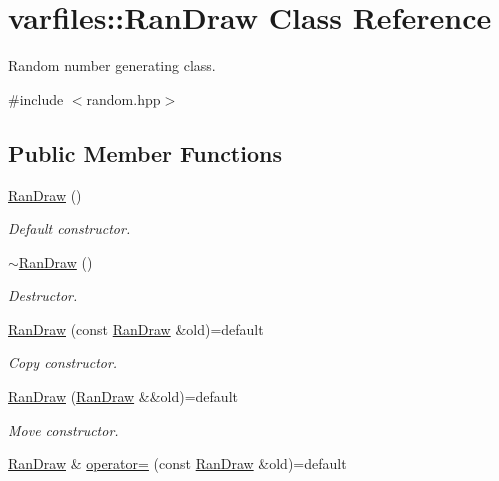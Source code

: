 \hypertarget{classvarfiles_1_1_ran_draw}{}\section{varfiles\+:\+:Ran\+Draw Class Reference}
\label{classvarfiles_1_1_ran_draw}


Random number generating class.  




{\ttfamily \#include $<$random.\+hpp$>$}

\subsection*{Public Member Functions}
\begin{DoxyCompactItemize}
\item 
\hyperlink{classvarfiles_1_1_ran_draw_aeda47451836b452b8fc819016242e6e6}{Ran\+Draw} ()
\begin{DoxyCompactList}\small\item\em Default constructor. \end{DoxyCompactList}\item 
\mbox{\label{classvarfiles_1_1_ran_draw_a0041f7be024890f48f5db63fa37a5cc3}} 
\hyperlink{classvarfiles_1_1_ran_draw_a0041f7be024890f48f5db63fa37a5cc3}{$\sim$\+Ran\+Draw} ()
\begin{DoxyCompactList}\small\item\em Destructor. \end{DoxyCompactList}\item 
\hyperlink{classvarfiles_1_1_ran_draw_a93397b17c6615fe3166a065a1667401f}{Ran\+Draw} (const \hyperlink{classvarfiles_1_1_ran_draw}{Ran\+Draw} \&old)=default
\begin{DoxyCompactList}\small\item\em Copy constructor. \end{DoxyCompactList}\item 
\hyperlink{classvarfiles_1_1_ran_draw_a1e4bf61c54ea31ff650707939a0d8fa3}{Ran\+Draw} (\hyperlink{classvarfiles_1_1_ran_draw}{Ran\+Draw} \&\&old)=default
\begin{DoxyCompactList}\small\item\em Move constructor. \end{DoxyCompactList}\item 
\hyperlink{classvarfiles_1_1_ran_draw}{Ran\+Draw} \& \hyperlink{classvarfiles_1_1_ran_draw_ac4576939ba8d09ad19b57ceb148864fa}{operator=} (const \hyperlink{classvarfiles_1_1_ran_draw}{Ran\+Draw} \&old)=default

\end{DoxyCompactItemize}
